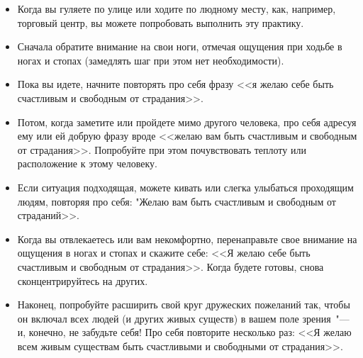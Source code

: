 \begin{itemize}
	\item Когда вы гуляете по улице или ходите по людному месту, как, например, торговый центр, вы можете попробовать выполнить эту практику.
	\item Сначала обратите внимание на свои ноги, отмечая ощущения при ходьбе в ногах и стопах (замедлять шаг при этом нет необходимости).
	\item Пока вы идете, начните повторять про себя фразу <<я желаю себе быть счастливым и свободным от страдания>>.
	\item Потом, когда заметите или пройдете мимо другого человека, про себя адресуя ему или ей добрую фразу вроде <<желаю вам быть счастливым и свободным от страдания>>. Попробуйте при этом почувствовать теплоту или расположение к этому человеку.
	\item Если ситуация подходящая, можете кивать или слегка улыбаться проходящим людям, повторяя про себя: "Желаю вам быть счастливым и свободным от страданий>>.
	\item Когда вы отвлекаетесь или вам некомфортно, перенаправьте свое внимание на ощущения в ногах и стопах и скажите себе: <<Я желаю себе быть счастливым и свободным от страдания>>. Когда будете готовы, снова сконцентрируйтесь на других.
	\item Наконец, попробуйте расширить свой круг дружеских пожеланий так, чтобы он включал всех людей (и других живых существ) в вашем поле зрения~"--- и, конечно, не забудьте себя! Про себя повторите несколько раз: <<Я желаю всем живым существам быть счастливыми и свободными от страдания>>.
\end{itemize}

\newpage
{}